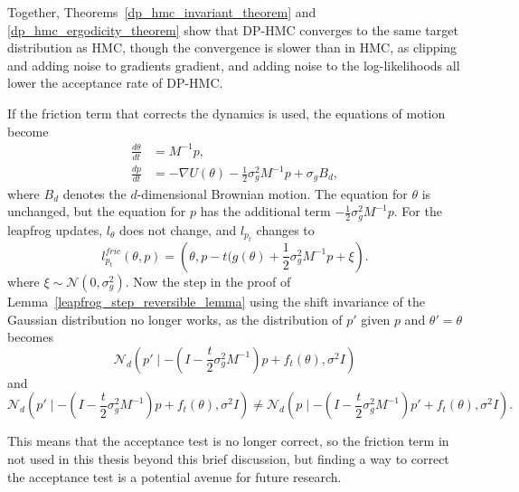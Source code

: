 \documentclass[english,twoside,openright]{HYgraduMLDS}
\newcommand{\caln}{{\mathcal{N}}}
\begin{document}
Together, Theorems~\ref{dp_hmc_invariant_theorem} and \ref{dp_hmc_ergodicity_theorem}
show that DP-HMC converges to the same target distribution as HMC, though
the convergence is slower than in HMC, as clipping and adding noise to
gradients gradient, and adding noise to the log-likelihoods all lower the
acceptance rate of DP-HMC.

If the friction term that corrects the dynamics is used, the equations of
motion become~\cite{CFG14}
\begin{align*}
  \frac{d\theta}{dt} &= M^{-1}p, \\
  \frac{dp}{dt} &= -\nabla U(\theta) - \frac{1}{2}\sigma_{g}^{2}M^{-1}p + \sigma_{g}B_{d},
\end{align*}
where \(B_{d}\) denotes the \(d\)-dimensional Brownian motion.
The equation for \(\theta\) is unchanged, but the equation for \(p\) has the
additional term \(-\frac{1}{2}\sigma_{g}^{2}M^{-1}p\).
For the leapfrog updates, \(l_{\theta}\) does not change, and \(l_{p_{t}}\) changes
to
\[
  l_{p_{t}}^{fric}(\theta, p) = \left(\theta, p - t(g(\theta)
  + \frac{1}{2}\sigma_{g}^{2}M^{-1}p + \xi\right).
\]
where \(\xi \sim \caln(0, \sigma_{g}^{2})\).
Now the step in the proof of Lemma~\ref{leapfrog_step_reversible_lemma}
using the shift invariance of the Gaussian distribution no longer works,
as the distribution of \(p'\) given \(p\) and \(\theta' = \theta\) becomes
\[
  \caln_{d}\left(p'\mid - \left(I - \frac{t}{2}\sigma_{g}^{2}M^{-1}\right)p
    + f_{t}(\theta), \sigma^{2}I\right)
\]
and
\[
  \caln_{d}\left(p'\mid - \left(I - \frac{t}{2}\sigma_{g}^{2}M^{-1}\right)p
    + f_{t}(\theta), \sigma^{2}I\right)
  \neq \caln_{d}\left(p\mid - \left(I - \frac{t}{2}\sigma_{g}^{2}M^{-1}\right)p'
    + f_{t}(\theta), \sigma^{2}I\right).
\]

This means that the acceptance test is no longer correct, so
the friction term in not used in this thesis beyond this brief discussion,
but finding a way to correct the acceptance test is a potential avenue for
future research.
\end{document}
